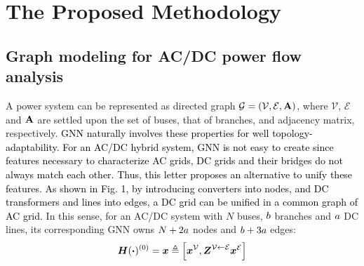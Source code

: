 \documentclass[lettersize,journal]{IEEEtran}
\begin{document}
\vspace{-0.8em}
\section{The Proposed Methodology}
\subsection{Graph modeling for AC/DC power flow analysis}
A power system can be represented as directed graph $\mathcal{G} = (\mathcal{V}, \mathcal{E}, \bold{A})$, where $\mathcal{V}$, $\mathcal{E}$ and $\bold{A}$ are settled upon the set of buses, that of branches, and adjacency matrix, respectively. \textcolor{black}{GNN naturally involves these properties for well topology-adaptability. For an AC/DC hybrid system, GNN is not easy to create since features necessary to characterize AC grids, DC grids and their bridges do not always match each other. Thus, this letter proposes an alternative to unify these features. As shown in Fig. 1, by introducing converters into nodes, and DC transformers and lines into edges, a DC grid can be unified in a common graph of AC grid.} In this sense, for an AC/DC system with $N$ buses, $\textcolor{black}{b}$ branches and $\textcolor{black}{a}$ DC lines, its corresponding GNN owns $N+2\textcolor{black}{a}$ nodes and $\textcolor{black}{b}+3\textcolor{black}{a}$ edges:
\vspace{-1ex}
\label{eq_8}
\begin{equation}
  \boldsymbol{H}(\boldsymbol\cdot)^{(0)} = \boldsymbol{x} \triangleq \left [ \boldsymbol{x}^\mathcal{V}, \boldsymbol{\textcolor{black}{Z}}^{\mathcal{V} \leftarrow \mathcal{E}} \boldsymbol{x}^\mathcal{E} \right ] \vspace{-1ex} 
\end{equation}
\end{document}
